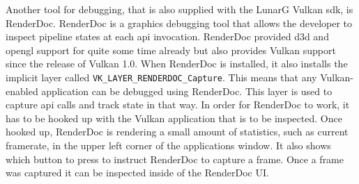     Another tool for debugging, that is also supplied with the LunarG Vulkan \gls{sdk}, is RenderDoc\cite{renderdoc}.
    RenderDoc is a graphics debugging tool that allows the developer to inspect pipeline states at each \gls{api} invocation.
    RenderDoc provided \gls{d3d} and \gls{opengl} support for quite some time already but also provides Vulkan support since the release of Vulkan 1.0.
    When RenderDoc is installed, it also installs the implicit layer called \lstinline{VK_LAYER_RENDERDOC_Capture}.
    This means that any Vulkan-enabled application can be debugged using RenderDoc.
    This layer is used to capture \gls{api} calls and track state in that way.
    In order for RenderDoc to work, it has to be hooked up with the Vulkan application that is to be inspected.
    Once hooked up, RenderDoc is rendering a small amount of statistics, such as current framerate, in the upper left corner of the applications window.
    It also shows which button to press to instruct RenderDoc to capture a frame.
    Once a frame was captured it can be inspected inside of the RenderDoc UI.

